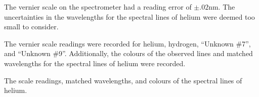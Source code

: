 \begin{paper}
The vernier scale on the spectrometer had a reading error of
$\pm.02\si{\nano\meter}$.
The uncertainties in the wavelengths for the spectral lines of helium were
deemed too small to consider.

The vernier scale readings were recorded for helium, hydrogen, ``Unknown \#7'',
and ``Unknown \#9''.
Additionally, the colours of the observed lines and matched wavelengths for the
spectral lines of helium were recorded.

{The scale readings, matched wavelengths, and colours of the spectral lines of helium.}\vspace{1em}


\end{paper}
